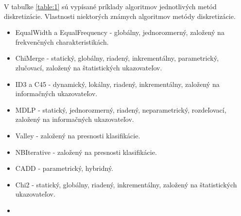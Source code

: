 V tabuľke \ref{table:1} sú vypísané príklady algoritmov jednotlivých metód diskretizácie. 
Vlastnosti niektorých známych algoritmov metódy diskretizácie. 
\begin{itemize}
	\item EqualWidth a EqualFrequency - globálny, jednorozmerný, založený na frekvenčných charakteristikách.\cite{Wong1987} 

\item
ChiMerge - statický, globálny, riadený, inkrementálny, parametrický, zlučovací, založený na štatistických ukazovateľov.
\cite{Keber1992} 
\item
ID3 a C45 - dynamický, lokálny, riadený, inkrementálny, založený na informačných ukazovateľov. 
\cite{Quinlan1993} 

\item
MDLP - statický, jednorozmerný, riadený, neparametrický, rozdeľovací, založený na informačných ukazovateľov.
\cite{Fayyad1993} 
\item
Valley - založený na presnosti klasifikácie. 
\cite{Ventura1994} 
\item
NBIterative - založený na presnosti klasifikácie. 
\cite{Pazzani1995} 

\item
CADD - parametrický, hybridný. 
\cite{Ching1995} 
\item
Chi2 - statický, globálny, riadený, inkrementálny, založený na štatistických ukazovateľov.
\cite{Liu1997} 
\item


\end{itemize}
